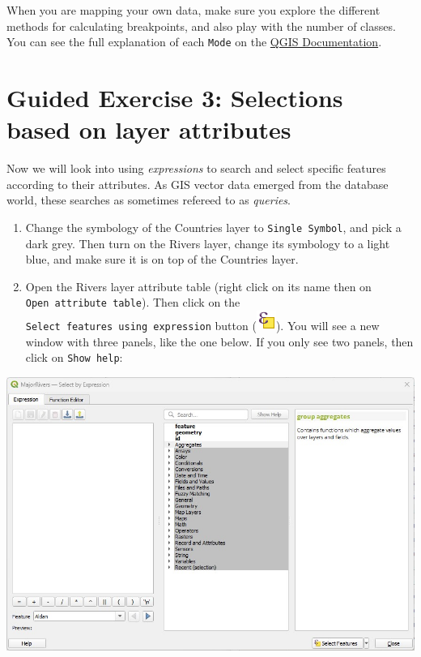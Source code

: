 \documentclass[
  letterpaper,
  DIV=11,
  numbers=noendperiod]{scrreprt}
\begin{document}
When you are mapping your own data, make sure you explore the different
methods for calculating breakpoints, and also play with the number of
classes. You can see the full explanation of each \texttt{Mode} on the
\href{https://docs.qgis.org/3.34/en/docs/user_manual/working_with_vector/vector_properties.html\#graduated-renderer}{QGIS
Documentation}.

\section{Guided Exercise 3: Selections based on layer
attributes}\label{guided-exercise-3-selections-based-on-layer-attributes}

Now we will look into using \emph{expressions} to search and select
specific features according to their attributes. As GIS vector data
emerged from the database world, these searches as sometimes refereed to
as \emph{queries}.

\begin{enumerate}
\def\labelenumi{(\arabic{enumi})}
\setcounter{enumi}{76}
\item
  Change the symbology of the Countries layer to
  \texttt{Single\ Symbol}, and pick a dark grey. Then turn on the Rivers
  layer, change its symbology to a light blue, and make sure it is on
  top of the Countries layer.
\item
  Open the Rivers layer attribute table (right click on its name then on
  \texttt{Open\ attribute\ table}). Then click on the
  \texttt{Select\ features\ using\ expression} button
  (\includegraphics{index_files/mediabag/mIconExpressionSelec.png}). You
  will see a new window with three panels, like the one below. If you
  only see two panels, then click on \texttt{Show\ help}:
\end{enumerate}

\includegraphics{images/lab_3/lab3_fig2_select_feat_exp.jpg}
\end{document}
